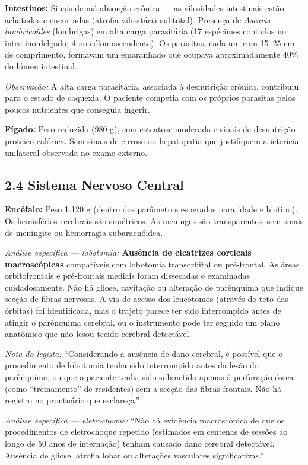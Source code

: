 \textbf{Intestinos:} Sinais de má absorção crônica --- as vilosidades intestinais estão achatadas e encurtadas (atrofia vilositária subtotal). Presença de \textit{Ascaris lumbricoides} (lombrigas) em alta carga parasitária (17 espécimes contados no intestino delgado, 4 no cólon ascendente). Os parasitas, cada um com 15–25 cm de comprimento, formavam um emaranhado que ocupava aproximadamente 40\% do lúmen intestinal.

\textit{Observação:} A alta carga parasitária, associada à desnutrição crônica, contribuiu para o estado de caquexia. O paciente competia com os próprios parasitas pelos poucos nutrientes que conseguia ingerir.

\textbf{Fígado:} Peso reduzido (980 g), com esteatose moderada e sinais de desnutrição proteico-calórica. Sem sinais de cirrose ou hepatopatia que justifiquem a icterícia unilateral observada no exame externo.

\subsection*{2.4 Sistema Nervoso Central}

\textbf{Encéfalo:} Peso 1.120 g (dentro dos parâmetros esperados para idade e biotipo). Os hemisférios cerebrais são simétricos. As meninges são transparentes, sem sinais de meningite ou hemorragia subaracnóidea.

\textit{Análise específica --- lobotomia:} \textbf{Ausência de cicatrizes corticais macroscópicas} compatíveis com lobotomia transorbital ou pré-frontal. As áreas orbitofrontais e pré-frontais mediais foram dissecadas e examinadas cuidadosamente. Não há gliose, cavitação ou alteração de parênquima que indique secção de fibras nervosas. A via de acesso dos leucótomos (através do teto das órbitas) foi identificada, mas o trajeto parece ter sido interrompido antes de atingir o parênquima cerebral, ou o instrumento pode ter seguido um plano anatômico que não lesou tecido cerebral detectável.

\textit{Nota do legista:} ``Considerando a ausência de dano cerebral, é possível que o procedimento de lobotomia tenha sido interrompido antes da lesão do parênquima, ou que o paciente tenha sido submetido apenas à perfuração óssea (como ``treinamento'' de residentes) sem a secção das fibras frontais. Não há registro no prontuário que esclareça.''

\textit{Análise específica --- eletrochoque:} ``Não há evidência macroscópica de que os procedimentos de eletrochoque repetido (estimados em centenas de sessões ao longo de 50 anos de internação) tenham causado dano cerebral detectável. Ausência de gliose, atrofia lobar ou alterações vasculares significativas.''

